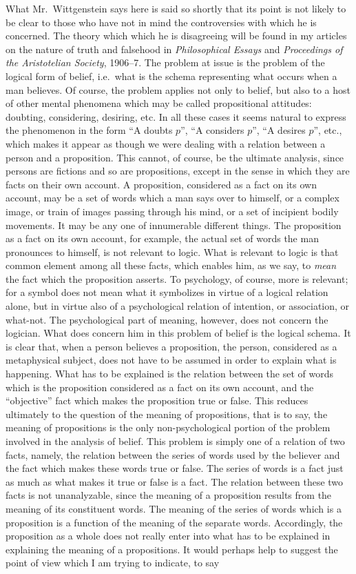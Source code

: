What Mr.\ Wittgenstein says here is said so shortly that its point is not likely to be clear to those who have not in mind the controversies with which he is concerned. The theory which which he is disagreeing will be found in my articles on the nature of truth and falsehood in \emph{Philosophical Essays} and \emph{Proceedings of the Aristotelian Society}, 1906–7. The problem at issue is the problem of the logical form of belief, i.e.\ what is the schema representing what occurs when a man believes. Of course, the problem applies not only to belief, but also to a host of other mental phenomena which may be called propositional attitudes: doubting, considering, desiring, etc. In all these cases it seems natural to express the phenomenon in the form “A doubts $p$”, “A considers $p$”, “A desires $p$”, etc., which makes it appear as though we were dealing with a relation between a person and a proposition. This cannot, of course, be the ultimate analysis, since persons are fictions and so are propositions, except in the sense in which they are facts on their own account. A proposition, considered as a fact on its own account, may be a set of words which a man says over to himself, or a complex image, or train of images passing through his mind, or a set of incipient bodily movements. It may be any one of innumerable different things. The proposition as a fact on its own account, for example, the actual set of words the man pronounces to himself, is not relevant to logic. What is relevant to logic is that common element among all these facts, which enables him, as we say, to \emph{mean} the fact which the proposition asserts. To psychology, of course, more is relevant; for a symbol does not mean what it symbolizes in virtue of a logical relation alone, but in virtue also of a psychological relation of intention, or association, or what-not. The psychological part of meaning, however, does not concern the logician. What does concern him in this problem of belief is the logical schema. It is clear that, when a person believes a proposition, the person, considered as a metaphysical subject, does not have to be assumed in order to explain what is happening. What has to be explained is the relation between the set of words which is the proposition considered as a fact on its own account, and the “objective” fact which makes the proposition true or false. This reduces ultimately to the question of the meaning of propositions, that is to say, the meaning of propositions is the only non-psychological portion of the problem involved in the analysis of belief. This problem is simply one of a relation of two facts, namely, the relation between the series of words used by the believer and the fact which makes these words true or false. The series of words is a fact just as much as what makes it true or false is a fact. The relation between these two facts is not unanalyzable, since the meaning of a proposition results from the meaning of its constituent words. The meaning of the series of words which is a proposition is a function of the meaning of the separate words. Accordingly, the proposition as a whole does not really enter into what has to be explained in explaining the meaning of a propositions. It would perhaps help to suggest the point of view which I am trying to indicate, to say 